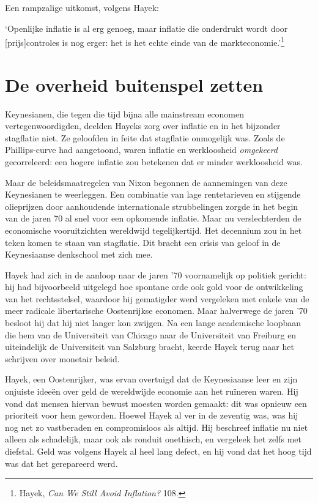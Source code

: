 \documentclass[
  a5paper,
  smalldemyvopaper,11pt,twoside,onecolumn,openright,extrafontsizes,
hidelinks]{memoir}
\renewenvironment{quote}%
               {\list{}{\rightmargin=.3cm\leftmargin=.3cm}%
                \itshape \item[]}%
               {\endlist}
\begin{document}
Een rampzalige uitkomst, volgens Hayek:

\begin{quote}
`Openlijke inflatie is al erg genoeg, maar inflatie die onderdrukt wordt
door {[}prijs{]}controles is nog erger: het is het echte einde van de
markteconomie.'\footnote{\hspace{0pt}Hayek, \emph{Can We Still Avoid
  Inflation?} 108.}
\end{quote}

\section{De overheid buitenspel
zetten}\label{de-overheid-buitenspel-zetten}

Keynesianen, die tegen die tijd bijna alle mainstream economen
vertegenwoordigden, deelden Hayeks zorg over inflatie en in het
bijzonder stagflatie niet. Ze geloofden in feite dat stagflatie
onmogelijk was. Zoals de Phillips-curve had aangetoond, waren inflatie
en werkloosheid \emph{omgekeerd} gecorreleerd: een hogere inflatie zou
betekenen dat er minder werkloosheid was.

Maar de beleidsmaatregelen van Nixon begonnen de aannemingen van deze
Keynesianen te weerleggen. Een combinatie van lage rentetarieven en
stijgende olieprijzen door aanhoudende internationale strubbelingen
zorgde in het begin van de jaren 70 al snel voor een opkomende inflatie.
Maar nu verslechterden de economische vooruitzichten wereldwijd
tegelijkertijd. Het decennium zou in het teken komen te staan van
stagflatie. Dit bracht een crisis van geloof in de Keynesiaanse
denkschool met zich mee.

Hayek had zich in de aanloop naar de jaren '70 voornamelijk op politiek
gericht: hij had bijvoorbeeld uitgelegd hoe spontane orde ook gold voor
de ontwikkeling van het rechtsstelsel, waardoor hij gematigder werd
vergeleken met enkele van de meer radicale libertarische Oostenrijkse
economen. Maar halverwege de jaren '70 besloot hij dat hij niet langer
kon zwijgen. Na een lange academische loopbaan die hem van de
Universiteit van Chicago naar de Universiteit van Freiburg en
uiteindelijk de Universiteit van Salzburg bracht, keerde Hayek terug
naar het schrijven over monetair beleid.

Hayek, een Oostenrijker, was ervan overtuigd dat de Keynesiaanse leer en
zijn onjuiste ideeën over geld de wereldwijde economie aan het ruïneren
waren. Hij vond dat mensen hiervan bewust moesten worden gemaakt: dit
was opnieuw een prioriteit voor hem geworden. Hoewel Hayek al ver in de
zeventig was, was hij nog net zo vastberaden en compromisloos als
altijd. Hij beschreef inflatie nu niet alleen als schadelijk, maar ook
als ronduit onethisch, en vergeleek het zelfs met diefstal. Geld was
volgens Hayek al heel lang defect, en hij vond dat het hoog tijd was dat
het gerepareerd werd.
\end{document}
